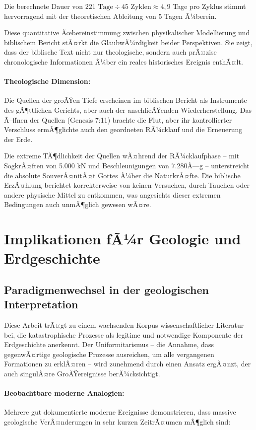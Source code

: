 ﻿\documentclass[12pt,a4paper]{report}
\begin{document}
Die berechnete Dauer von $221 \text{ Tage} \div 45 \text{ Zyklen} \approx 4{,}9$ Tage pro Zyklus stimmt hervorragend mit der theoretischen Ableitung von 5 Tagen Ã¼berein.

Diese quantitative Ãœbereinstimmung zwischen physikalischer Modellierung und biblischem Bericht stÃ¤rkt die GlaubwÃ¼rdigkeit beider Perspektiven. Sie zeigt, dass der biblische Text nicht nur theologische, sondern auch prÃ¤zise chronologische Informationen Ã¼ber ein reales historisches Ereignis enthÃ¤lt.

\paragraph{Theologische Dimension:}
Die Quellen der groÃŸen Tiefe erscheinen im biblischen Bericht als Instrumente des gÃ¶ttlichen Gerichts, aber auch der anschlieÃŸenden Wiederherstellung. Das Ã–ffnen der Quellen (Genesis 7:11) brachte die Flut, aber ihr kontrollierter Verschluss ermÃ¶glichte auch den geordneten RÃ¼cklauf und die Erneuerung der Erde.

Die extreme TÃ¶dlichkeit der Quellen wÃ¤hrend der RÃ¼cklaufphase -- mit SogkrÃ¤ften von 5.000 kN und Beschleunigungen von 7.280Ã—g -- unterstreicht die absolute SouverÃ¤nitÃ¤t Gottes Ã¼ber die NaturkrÃ¤fte. Die biblische ErzÃ¤hlung berichtet korrekterweise von keinen Versuchen, durch Tauchen oder andere physische Mittel zu entkommen, was angesichts dieser extremen Bedingungen auch unmÃ¶glich gewesen wÃ¤re.

\section{Implikationen fÃ¼r Geologie und Erdgeschichte}

\subsection{Paradigmenwechsel in der geologischen Interpretation}

Diese Arbeit trÃ¤gt zu einem wachsenden Korpus wissenschaftlicher Literatur bei, die katastrophische Prozesse als legitime und notwendige Komponente der Erdgeschichte anerkennt. Der Uniformitarismus -- die Annahme, dass gegenwÃ¤rtige geologische Prozesse ausreichen, um alle vergangenen Formationen zu erklÃ¤ren -- wird zunehmend durch einen Ansatz ergÃ¤nzt, der auch singulÃ¤re GroÃŸereignisse berÃ¼cksichtigt.

\paragraph{Beobachtbare moderne Analogien:}
Mehrere gut dokumentierte moderne Ereignisse demonstrieren, dass massive geologische VerÃ¤nderungen in sehr kurzen ZeitrÃ¤umen mÃ¶glich sind:
\end{document}
